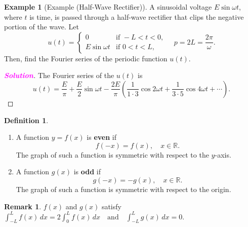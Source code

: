 \documentclass[12pt,openany]{book}
\theoremstyle{definition}
\newtheorem{definition}{Definition}[chapter]
\newtheorem{remark}{Remark}[chapter]
\newtheorem{example}{Example}[chapter]
\newcommand{\sol}{\textcolor{magenta}{\bf Solution}}
\begin{document}
	\begin{example}[Example (Half-Wave Rectifier)]
		A sinusoidal voltage \(E \sin \omega t\), where \(t\) is time, is passed through a half-wave rectifier that clips the negative portion of the wave. Let
		\[
		u(t) = 
		\begin{cases}
			0 & \text{if } -L < t < 0, \\
			E \sin \omega t & \text{if } 0 < t < L,
		\end{cases}
		\quad p = 2L = \frac{2\pi}{\omega}.
		\]
		Then, find the Fourier series of the periodic function \(u(t)\).
		\begin{proof}[\sol]
			The Fourier series of the \(u(t)\) is
			\[
			u(t) = \frac{E}{\pi} + \frac{E}{2} \sin \omega t - \frac{2E}{\pi} \left( \frac{1}{1\cdot 3} \cos 2\omega t + \frac{1}{3\cdot 5} \cos 4\omega t + \cdots \right).
			\]
		\end{proof}
	\end{example}	
	\vspace{24pt}
	\newpage
	\begin{tcolorbox}[colframe=defcolor, title={\color{white}\bf Even and Odd Functions}]
		\begin{definition}
			\begin{enumerate}[(1)]
				\item A function \( y = f(x) \) is \textbf{even} if
				\[
				f(-x) = f(x), \quad x \in \mathbb{R}.
				\]
				The graph of such a function is symmetric with respect to the \( y \)-axis.
				\item A function \( g(x) \) is \textbf{odd} if
				\[
				g(-x) = -g(x), \quad x \in \mathbb{R}.
				\]
				The graph of such a function is symmetric with respect to the origin.
			\end{enumerate}
		\end{definition}
	\end{tcolorbox}
	\begin{remark}
		\( f(x) \) and \( g(x) \) satisfy
		$\displaystyle
		\int_{-L}^{L} f(x) \, dx = 2 \int_{0}^{L} f(x) \, dx \quad \text{and} \quad \int_{-L}^{L} g(x) \, dx = 0.
		$
	\end{remark}
\end{document}
